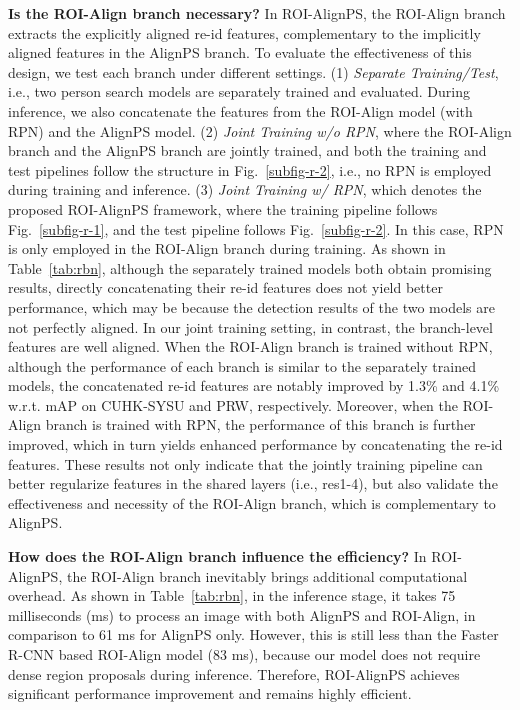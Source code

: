 \documentclass[journal]{IEEEtran}
\begin{document}
\textbf{Is the ROI-Align branch necessary?} 
In ROI-AlignPS, the ROI-Align branch extracts the explicitly aligned re-id features, complementary to the implicitly aligned features in the AlignPS branch. To evaluate the effectiveness of this design, we test each branch under different settings. (1) \textit{Separate Training/Test}, i.e., two person search models are separately trained and evaluated. During inference, we also concatenate the features from the ROI-Align model (with RPN) and the AlignPS model. (2) \textit{Joint Training w/o RPN}, where the ROI-Align branch and the AlignPS branch are jointly trained, and both the training and test pipelines follow the structure in Fig.~\ref{subfig-r-2}, i.e., no RPN is employed during training and inference.
(3) \textit{Joint Training w/ RPN}, which denotes the proposed ROI-AlignPS framework, where the training pipeline follows Fig.~\ref{subfig-r-1}, and the test pipeline follows Fig.~\ref{subfig-r-2}. In this case, RPN is only employed in the ROI-Align branch during training. As shown in Table~\ref{tab:rbn}, although the separately trained models both obtain promising results, directly concatenating their re-id features does not yield better performance, which may be because the detection results of the two models are not perfectly aligned. In our joint training setting, in contrast, the branch-level features are well aligned. When the ROI-Align branch is trained without RPN, although the performance of each branch is similar to the separately trained models, the concatenated re-id features are notably improved by 1.3\% and 4.1\% w.r.t. mAP on CUHK-SYSU and PRW, respectively. Moreover, when the ROI-Align branch is trained with RPN, the performance of this branch is further improved, which in turn yields enhanced performance by concatenating the re-id features. These results not only indicate that the jointly training pipeline can better regularize features in the shared layers (i.e., res1-4), but also validate the effectiveness and necessity of the ROI-Align branch, which is complementary to AlignPS.




\textbf{How does the ROI-Align branch influence the efficiency?}
In ROI-AlignPS, the ROI-Align branch inevitably brings additional computational overhead. As shown in Table~\ref{tab:rbn}, in the inference stage, it takes 75 milliseconds (ms) to process an image with both AlignPS and ROI-Align, in comparison to 61 ms for AlignPS only. However, this is still less than the Faster R-CNN based ROI-Align model (83 ms), because our model does not require dense region proposals during inference. Therefore, ROI-AlignPS achieves significant performance improvement and remains highly efficient.  
\end{document}
